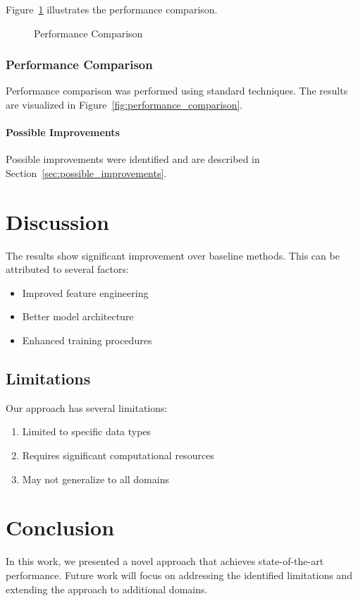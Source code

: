 \documentclass{article}
\begin{document}
Figure~\ref{fig:results} illustrates the performance comparison.

\begin{figure}[h]
\centering
\caption{Performance Comparison}
\label{fig:results}
\end{figure}

\subsection{Performance Comparison}
\label{subsec:performance_comparison}

Performance comparison was performed using standard techniques. The results are visualized in Figure~\ref{fig:performance_comparison}.

\subsubsection{Possible Improvements}
\label{subsubsection:possible_improvements}

Possible improvements were identified and are described in Section~\ref{sec:possible_improvements}.

\chapter{Discussion}
\label{chap:discussion}

The results show significant improvement over baseline methods. This can be attributed to several factors:

\begin{itemize}
\item Improved feature engineering
\item Better model architecture
\item Enhanced training procedures
\end{itemize}

\section{Limitations}
\label{sec:limitations}

Our approach has several limitations:

\begin{enumerate}
\item Limited to specific data types
\item Requires significant computational resources
\item May not generalize to all domains
\end{enumerate}

\chapter{Conclusion}
\label{chap:conclusion}

In this work, we presented a novel approach that achieves state-of-the-art performance. Future work will focus on addressing the identified limitations and extending the approach to additional domains.



\end{document}
